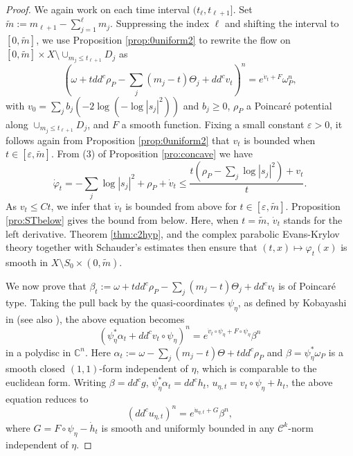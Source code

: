 \documentclass[11pt]{amsart}
\numberwithin{equation}{section}
\newcommand{\f}{\varphi}
\begin{document}
 
  \begin{proof}
  We again work on each time interval $(t_{\ell},t_{\ell+1}]$. 
  Set $\tilde{m}:=m_{\ell+1}-\sum_{j=1}^{\ell} m_j$. 
  Suppressing the index $\ell$ and shifting the interval to $[0,\tilde{m}]$, we use Proposition \ref{prop:0uniform2} to rewrite the flow on $[0,\tilde{m}]\times X\setminus \cup_{m_j\leq t_{\ell+1}}D_j$ as 
 \[
 \left( \omega + tdd^c \rho_P -\sum_j (m_j-t) \Theta_j+ dd^c v_t\right)^n = e^{\dot{v}_t+F}\omega_P^n,
 \]
with $v_0=\sum_{j}b_j(-2\log (-\log |s_j|^2))$ and $b_j\geq 0$, $\rho_P$  a Poincar\'e potential along $\cup_{m_j\leq t_{\ell+1}}D_j$, and $F$ a smooth function.
  Fixing a small constant $\varepsilon>0$, it follows again from Proposition \ref{prop:0uniform2} that $v_{t}$ is bounded when $t\in [\varepsilon,\tilde{m}]$. From (3) of Proposition \ref{pro:concave} we have
  $$\dot{\varphi}_t = -\sum_j \log |s_j|^2 +\rho_P +\dot{v}_t\leq \frac{t(\rho_P-\sum_j \log |s_j|^2)+v_t}{t}.$$ As $v_t\leq C t$, we infer that $\dot{v}_t$ is bounded from above for $t\in [\varepsilon,\tilde{m}]$.
  Proposition \ref{pro:STbelow} gives the bound from below. 
  Here, when $t=\tilde{m}$,  $\dot{v}_t$ stands for the left derivative.  Theorem \ref{thm:c2hyp}, and the complex parabolic Evans-Krylov theory together with Schauder’s estimates then ensure that $(t,x) \mapsto \f_t(x)$ is smooth in $X \setminus S_{0} \times (0,\tilde{m})$. 


We now prove that $\beta_t:= \omega + tdd^c \rho_P -\sum_j (m_j-t) \Theta_j+ dd^c v_t$ is of Poincar\'e type.
Taking the pull back by the quasi-coordinates $\psi_{\eta}$, as defined by Kobayashi in \cite{Kob84} 
(see also \cite{Gue14,Auv17}), the above equation becomes
\[
\left( \psi_{\eta}^*\alpha_t + dd^c v_t\circ \psi_{\eta}\right )^n=e^{\dot{v}_t\circ \psi_{\eta}+ F\circ \psi_{\eta}} \beta^n
\]
in a polydisc in $\mathbb C^n$. Here $\alpha_t:=\omega-\sum_j(m_j-t)\Theta +tdd^c \rho_P$ and $\beta=\psi_{\eta}^* \omega_P$ is a smooth closed $(1,1)$-form independent of $\eta$, which is comparable to the euclidean form. Writing $\beta=dd^c g$, $\psi_{\eta}^*\alpha_t=dd^c h_{t}$, $u_{\eta,t}=v_t\circ \psi_{\eta}+h_t$, the above equation reduces to 
\[
(dd^c u_{\eta,t})^n =e^{\dot{u}_{\eta,t}+G} \beta^n,
\]
where $G=F\circ \psi_{\eta}-\dot{h}_t$ is smooth and uniformly 
bounded in any ${\mathcal C}^k$-norm independent of $\eta$. 


\end{proof}
\end{document}
